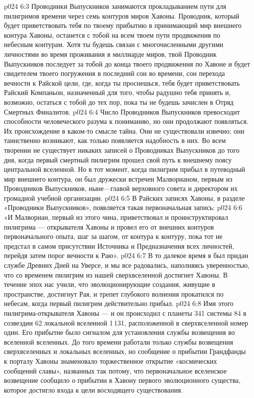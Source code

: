 \vs p024 6:3 Проводники Выпускников занимаются прокладыванием пути для пилигримов времени через семь контуров миров Хавоны. Проводник, который будет приветствовать тебя по твоему прибытию в принимающий мир внешнего контура Хавоны, останется с тобой на всем твоем пути продвижения по небесным контурам. Хотя ты будешь связан с многочисленными другими личностями во время проживания в миллиарде миров, твой Проводник Выпускников последует за тобой до конца твоего продвижения по Хавоне и будет свидетелем твоего погружения в последний сон во времени, сон перехода вечности к Райской цели, где, когда ты проснешься, тебя будет приветствовать Райский Компаньон, назначенный для того, чтобы радушно тебя принять и, возможно, остаться с тобой до тех пор, пока ты не будешь зачислен в Отряд Смертных Финалитов.
\vs p024 6:4 \pc Число Проводников Выпускников превосходит способности человеческого разума к пониманию, но они продолжают появляться. Их происхождение в каком\hyp{}то смысле тайна. Они не существовали извечно; они таинственно возникают, как только появляется надобность в них. Во всем творении не существует никаких записей о Проводниках Выпускников до того дня, когда первый смертный пилигрим прошел свой путь к внешнему поясу центральной вселенной. Но в тот момент, когда пилигрим прибыл в путеводный мир внешнего контура, он был дружески встречен Малворианом, первым из Проводников Выпускников, ныне---главой верховного совета и директором их громадной учебной организации.
\vs p024 6:5 В Райских записях Хавоны, в разделе «Проводники Выпускников», появляется такая первоначальная запись:
\vs p024 6:6 «И Малвориан, первый из этого чина, приветствовал и проинструктировал пилигрима --- открывателя Хавоны и провел его от внешних контуров первоначального опыта, шаг за шагом, от контура к контуру, пока тот не предстал в самом присутствии Источника и Предназначения всех личностей, перейдя затем порог вечности к Раю».
\vs p024 6:7 В то далекое время я был придан службе Древних Дней на Уверсе, и мы все радовались, наполняясь уверенностью, что со временем пилигрим из нашей сверхвселенной достигнет Хавоны. В течение эпох нас учили, что эволюционирующие создания, живущие в пространстве, достигнут Рая, и трепет глубокого волнения прокатился по небесам, когда первый пилигрим действительно прибыл.
\vs p024 6:8 \pc Имя этого пилигрима\hyp{}открывателя Хавоны ---  и он происходил с планеты 341 системы 84 в созвездии 62 локальной вселенной 1\,131, расположенной в сверхвселенной номер один. Его прибытие было сигналом для установления службы возвещения во вселенной вселенных. До того времени работали только службы возвещения сверхвселенных и локальных вселенных, но сообщение о прибытии Грандфанды к порталу Хавоны знаменовало торжественное открытие «космических сообщений славы», названных так потому, что первоначальное вселенское возвещение сообщило о прибытии в Хавону первого эволюционного существа, которое достигло входа к цели восходящего существования.
